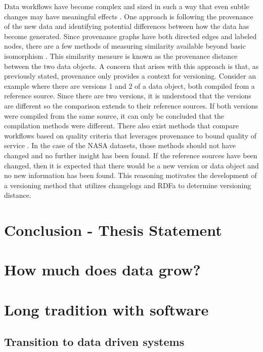 Data workflows have become complex and sized in such a way that even subtle changes may have meaningful effects \cite{TILMES2011548}.
One approach is following the provenance of the new data and identifying potential differences between how the data has become generated.
Since provenance graphs have both directed edges and labeled nodes, there are a few methods of measuring similarity available beyond basic isomorphism \cite{Cao2013} \cite{Gao2010} \cite{Goddard:1996:DGU:246962.246972} .
This similarity measure is known as the provenance distance between the two data objects.
A concern that arises with this approach is that, as previously stated, provenance only provides a context for versioning.
Consider an example where there are versions 1 and 2 of a data object, both compiled from a reference source.
Since there are two versions, it is understood that the versions are different so the comparison extends to their reference sources.
If both versions were compiled from the same source, it can only be concluded that the compilation methods were different.
There also exist methods that compare workflows based on quality criteria that leverages provenance to bound quality of service \cite{2015:CAA:2778374.2778504}.
In the case of the NASA datasets, those methods should not have changed and no further insight has been found.
If the reference sources have been changed, then it is expected that there would be a new version or data object and no new information has been found.
This reasoning motivates the development of a versioning method that utilizes changelogs and RDFa to determine versioning distance.

\section{Conclusion - Thesis Statement}


\section{How much does data grow?}

\section{Long tradition with software}
\subsection{Transition to data driven systems}

